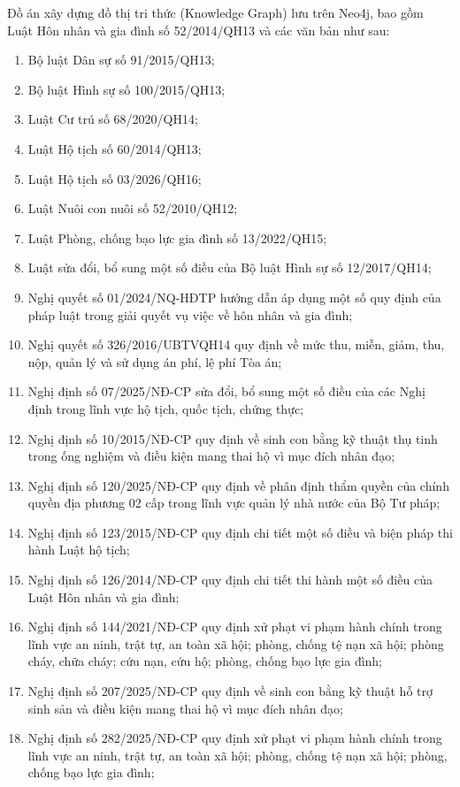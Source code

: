 \documentclass[../DoAn.tex]{subfiles}
\begin{document}
Đồ án xây dựng đồ thị tri thức (Knowledge Graph) lưu trên Neo4j, bao gồm Luật Hôn nhân và gia đình số 52/2014/QH13 và các văn bản như sau:
\begin{enumerate}
    \item Bộ luật Dân sự số 91/2015/QH13;
    \item Bộ luật Hình sự số 100/2015/QH13;
    \item Luật Cư trú số 68/2020/QH14;
    \item Luật Hộ tịch số 60/2014/QH13;
    \item Luật Hộ tịch số 03/2026/QH16;
    \item Luật Nuôi con nuôi số 52/2010/QH12;
    \item Luật Phòng, chống bạo lực gia đình số 13/2022/QH15;
    \item Luật sửa đổi, bổ sung một số điều của Bộ luật Hình sự số 12/2017/QH14;
    \item Nghị quyết số 01/2024/NQ-HĐTP hướng dẫn áp dụng một số quy định của pháp luật trong giải quyết vụ việc về hôn nhân và gia đình;
    \item Nghị quyết số 326/2016/UBTVQH14 quy định về mức thu, miễn, giảm, thu, nộp, quản lý và sử dụng án phí, lệ phí Tòa án;
    \item Nghị định số 07/2025/NĐ-CP sửa đổi, bổ sung một số điều của các Nghị định trong lĩnh vực hộ tịch, quốc tịch, chứng thực;
    \item Nghị định số 10/2015/NĐ-CP quy định về sinh con bằng kỹ thuật thụ tinh trong ống nghiệm và điều kiện mang thai hộ vì mục đích nhân đạo;
    \item Nghị định số 120/2025/NĐ-CP quy định về phân định thẩm quyền của chính quyền địa phương 02 cấp trong lĩnh vực quản lý nhà nước của Bộ Tư pháp;
    \item Nghị định số 123/2015/NĐ-CP quy định chi tiết một số điều và biện pháp thi hành Luật hộ tịch;
    \item Nghị định số 126/2014/NĐ-CP quy định chi tiết thi hành một số điều của Luật Hôn nhân và gia đình;
    \item Nghị định số 144/2021/NĐ-CP quy định xử phạt vi phạm hành chính trong lĩnh vực an ninh, trật tự, an toàn xã hội; phòng, chống tệ nạn xã hội; phòng cháy, chữa cháy; cứu nạn, cứu hộ; phòng, chống bạo lực gia đình;
    \item Nghị định số 207/2025/NĐ-CP quy định về sinh con bằng kỹ thuật hỗ trợ sinh sản và điều kiện mang thai hộ vì mục đích nhân đạo;
    \item Nghị định số 282/2025/NĐ-CP quy định xử phạt vi phạm hành chính trong lĩnh vực an ninh, trật tự, an toàn xã hội; phòng, chống tệ nạn xã hội; phòng, chống bạo lực gia đình;

\end{enumerate}
\end{document}
